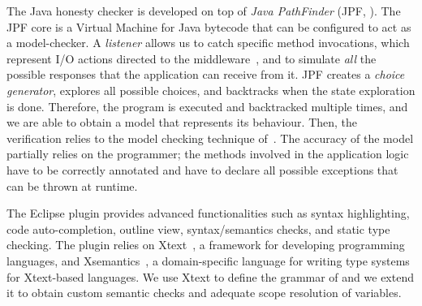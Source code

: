 The Java honesty checker is developed on top of \emph{Java PathFinder}
(JPF, \cite{lerda2001addressing,visser2003model}).
The JPF core is a Virtual Machine for Java bytecode
that can be configured to act as a model-checker.
%
A \emph{listener} allows us to catch specific method invocations, 
which represent I/O actions
directed to the middleware~\cite{CO2middleware},
and to simulate \emph{all} the possible responses that 
the application can receive from it.
%
JPF creates a \emph{choice generator}, explores all possible choices,
and backtracks when the state exploration is done.
%
Therefore, the program is executed and backtracked multiple times,
and we are able to obtain a \coco model that represents its behaviour.
Then, the verification relies to the model checking technique of~\cite{BMSZ15jlamp}.
%
The accuracy of the model partially relies on the programmer;
the methods involved in the application logic have to be correctly annotated
and have to declare all possible exceptions that can be thrown at runtime.

The Eclipse plugin provides advanced functionalities such as
syntax highlighting, 
code auto-completion, 
outline view,
syntax/semantics checks,
and static type checking.
%
The plugin relies on
Xtext~\cite{xtext-site}, a framework for developing programming languages, 
and Xsemantics~\cite{xsemantics-site}, a domain-specific language for writing type systems
for Xtext-based languages.
%
We use Xtext to define the grammar of \coco
and we extend it to obtain custom semantic checks and adequate scope resolution of variables.

